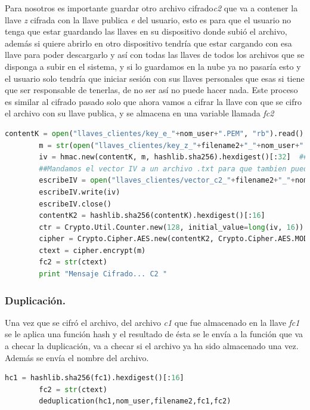 Para nosotros es importante guardar otro archivo cifrado\textit{c2} que va a contener la llave \textit{z} cifrada con la llave publica \textit{e} del usuario, esto es para que el usuario no tenga que estar guardando las llaves en su dispositivo donde subió el archivo, además si quiere abrirlo en otro dispositivo tendría que estar cargando con esa llave para poder descargarlo y así con todas las llaves de todos los archivos que se disponga a subir en el sistema, y si lo guardamos en la nube ya no pasaría esto y el usuario solo tendría que iniciar sesión con sus llaves personales que esas si tiene que ser responsable de tenerlas, de no ser así no puede hacer nada. Este proceso es similar al cifrado pasado solo que ahora vamos a cifrar la llave con que se cifro el archivo con su llave publica, y se almacena en una variable llamada \textit{fc2}

\begin{lstlisting}[language=Python,frame=single, keywordstyle=\color{blue},breaklines=true, showstringspaces=false]
        contentK = open("llaves_clientes/key_e_"+nom_user+".PEM", "rb").read()
        m = str(open("llaves_clientes/key_z_"+filename2+"_"+nom_user+".PEM", "rb").read())
        iv = hmac.new(contentK, m, hashlib.sha256).hexdigest()[:32]  ## Generacion del IV
        ##Mandamos el vector IV a un archivo .txt para que tambien pueda ser utilizado por el descifrado
        escribeIV = open("llaves_clientes/vector_c2_"+filename2+"_"+nom_user+".txt","wb")
        escribeIV.write(iv)
        escribeIV.close()
        contentK2 = hashlib.sha256(contentK).hexdigest()[:16]
        ctr = Crypto.Util.Counter.new(128, initial_value=long(iv, 16))
        cipher = Crypto.Cipher.AES.new(contentK2, Crypto.Cipher.AES.MODE_CTR, counter=ctr)
        ctext = cipher.encrypt(m)
        fc2 = str(ctext)
        print "Mensaje Cifrado... C2 "
\end{lstlisting}

\subsubsection{Duplicación.} 
Una vez que se cifró el archivo, del archivo \textit{c1} que fue almacenado en la llave \textit{fc1} se le aplica una función hash y el resultado de ésta se le envía a la función que va a checar la duplicación, va a checar si el archivo ya ha sido almacenado una vez. Además se envía el nombre del archivo.

\begin{lstlisting}[language=Python,frame=single, keywordstyle=\color{blue},breaklines=true, showstringspaces=false]
        hc1 = hashlib.sha256(fc1).hexdigest()[:16]
        fc2 = str(ctext)
        deduplication(hc1,nom_user,filename2,fc1,fc2)
\end{lstlisting}

